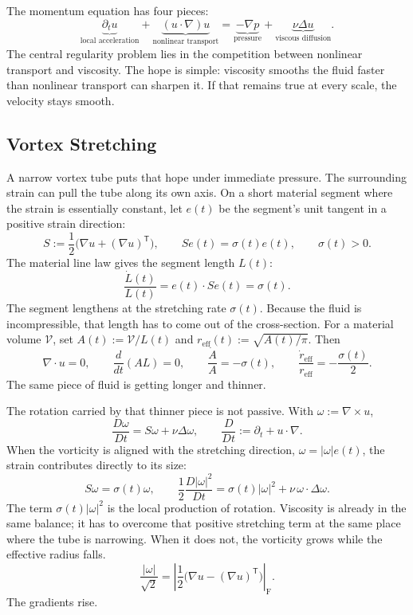 
The momentum equation has four pieces:
\[
  \underbrace{\partial_t u}_{\text{local acceleration}}
  +
  \underbrace{(u\cdot\nabla)u}_{\text{nonlinear transport}}
  =
  \underbrace{-\nabla p}_{\text{pressure}}
  +
  \underbrace{\nu\Delta u}_{\text{viscous diffusion}}.
\]
The central regularity problem lies in the competition between nonlinear transport and viscosity.
The hope is simple: viscosity smooths the fluid faster than nonlinear transport can sharpen it.
If that remains true at every scale, the velocity stays smooth.

\subsection{Vortex Stretching}\label{sub:ThePerfectlyStretchingVortex}

A narrow vortex tube puts that hope under immediate pressure.
The surrounding strain can pull the tube along its own axis.
On a short material segment where the strain is essentially constant, let \(e(t)\) be the segment's unit tangent in a positive strain direction:
\[
  S:=\frac12\bigl(\nabla u+(\nabla u)^{\mathsf T}\bigr),
  \qquad
  Se(t)=\sigma(t)e(t),
  \qquad
  \sigma(t)>0.
\]
The material line law gives the segment length \(L(t)\):
\[
  \frac{\dot L(t)}{L(t)}
  =
  e(t)\cdot Se(t)
  =
  \sigma(t).
\]
The segment lengthens at the stretching rate \(\sigma(t)\).
Because the fluid is incompressible, that length has to come out of the cross-section.
For a material volume \(\mathcal V\), set \(A(t):=\mathcal V/L(t)\) and
\(r_{\mathrm{eff}}(t):=\sqrt{A(t)/\pi}\).
Then
\[
  \nabla\cdot u=0,
  \qquad
  \frac{d}{dt}(A L)=0,
  \qquad
  \frac{\dot A}{A}=-\sigma(t),
  \qquad
  \frac{\dot r_{\mathrm{eff}}}{r_{\mathrm{eff}}}
  =
  -\frac{\sigma(t)}{2}.
\]
The same piece of fluid is getting longer and thinner.

The rotation carried by that thinner piece is not passive.
With \(\omega:=\nabla\times u\),
\[
  \frac{D\omega}{Dt}
  =
  S\omega+\nu\Delta\omega,
  \qquad
  \frac{D}{Dt}
  :=
  \partial_t+u\cdot\nabla.
\]
When the vorticity is aligned with the stretching direction, \(\omega=|\omega|e(t)\), the strain contributes directly to its size:
\[
  S\omega
  =
  \sigma(t)\omega,
  \qquad
  \frac12\frac{D|\omega|^2}{Dt}
  =
  \sigma(t)|\omega|^2
  +
  \nu\,\omega\cdot\Delta\omega.
\]
The term \(\sigma(t)|\omega|^2\) is the local production of rotation.
Viscosity is already in the same balance; it has to overcome that positive stretching term at the same place where the tube is narrowing.
When it does not, the vorticity grows while the effective radius falls.
\[
  \frac{|\omega|}{\sqrt2}
  =
  \left|\frac12\bigl(\nabla u-(\nabla u)^{\mathsf T}\bigr)\right|_{\mathrm F}.
\]
The gradients rise.

